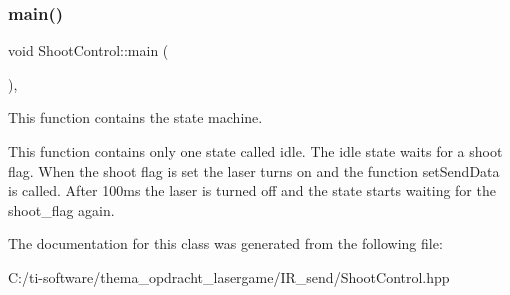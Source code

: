 \subsubsection{\texorpdfstring{main()}{main()}}
{\footnotesize\ttfamily void Shoot\+Control\+::main (\begin{DoxyParamCaption}{ }\end{DoxyParamCaption})\hspace{0.3cm}{\ttfamily [inline]}, {\ttfamily [override]}}



This function contains the state machine. 

This function contains only one state called idle. The idle state waits for a shoot flag. When the shoot flag is set the laser turns on and the function set\+Send\+Data is called. After 100ms the laser is turned off and the state starts waiting for the shoot\+\_\+flag again. 

The documentation for this class was generated from the following file\+:\begin{DoxyCompactItemize}
\item 
C\+:/ti-\/software/thema\+\_\+opdracht\+\_\+lasergame/\+I\+R\+\_\+send/Shoot\+Control.\+hpp\end{DoxyCompactItemize}
